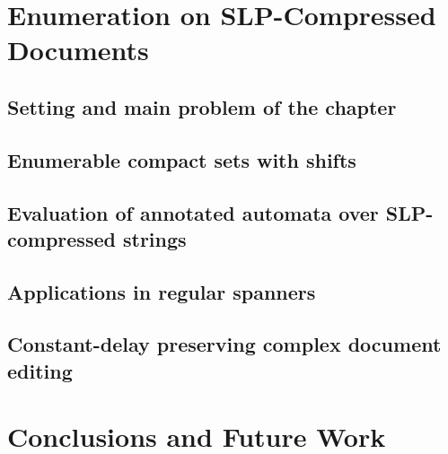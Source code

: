 \documentclass[pdftex]{pucthesis}	%
\begin{document}

\chapter[ENUMERATION ON SLP-COMPRESSED DOCUMENTS]{Enumeration on SLP-Compressed Documents} \label{ch3}

\label{slps:sec:introduction}


\section{Setting and main problem of the chapter}\label{slps:sec:setting}



\section{Enumerable compact sets with shifts}\label{slps:sec:ecs}



\section{Evaluation of annotated automata over SLP-compressed strings}\label{slps:sec:evaluation}



\section{Applications in regular spanners}\label{slps:sec:spanners}



\section{Constant-delay preserving complex document editing}\label{slps:sec:edits}







\chapter[CONCLUSIONS AND FUTURE WORK]{Conclusions and Future Work}\label{chapter:concl}
\end{document}
